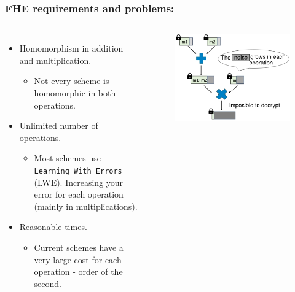 \documentclass[10pt,handout]{beamer}
\begin{document}

\begin{frame}
\frametitle{FHE requirements and problems:}
\vspace{0.3cm}
\begin{columns}
\begin{itemize}
  \item[\textcolor{frenchblue}{\textbullet}]
Homomorphism in addition and multiplication.
    \begin{itemize}
\pause
      \item[\textcolor{red}{\textbullet}]
Not every scheme is homomorphic in both operations.
    \end{itemize}
\pause
  \item[\textcolor{frenchblue}{\textbullet}]
Unlimited number of operations.
    \begin{itemize}
\pause
      \item[\textcolor{red}{\textbullet}]
Most schemes use \texttt{Learning With Errors} (LWE). Increasing your error for
each operation (mainly in multiplications).
    \end{itemize}
\pause
  \item[\textcolor{frenchblue}{\textbullet}]
Reasonable times.
    \begin{itemize}
\pause
      \item[\textcolor{red}{\textbullet}]
Current schemes have a very large cost for each operation - order of the second.
    \end{itemize}
\end{itemize}
\pause
        \begin{figure}[h!]
            \centering
            \includegraphics[scale=0.2]{multNoise.jpg}
        \end{figure}


\end{columns}
\end{frame}
\end{document}
